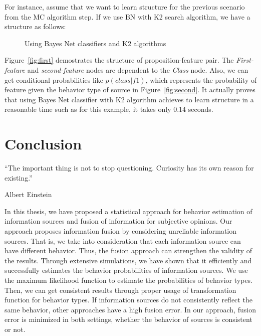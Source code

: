 \documentclass[a4,12pt]{ozu-thesis}
\begin{document}
For instance, assume that we want to learn structure for the previous scenario from the MC algorithm step. If we use BN with K2 search algorithm, we have a structure as follows:

\begin{figure}[ht!]
     \begin{center}
%
%
    \end{center}
    \caption{Using Bayes Net classifiers and K2 algorithms}
\end{figure}


Figure~\ref{fig:first} demostrates the structure of proposition-feature pair. The \textit{First-feature} and \textit{second-feature} nodes are dependent to the \textit{Class} node. Also, we can get conditional probabilities like $p\left ( class|f1 \right )$, which represents the probability of feature given the behavior type of source in Figure~\ref{fig:second}. It actually proves that using Bayes Net classifier with K2 algorithm achieves to learn structure in a reasonable time such as for this example, it takes only 0.14 seconds.

\chapter{Conclusion}
\epigraph{``The important thing is not to stop questioning. Curiosity has its own reason for existing.''}{Albert Einstein}
In this thesis, we have proposed a statistical approach for behavior estimation of information sources and fusion of information for subjective opinions. Our approach proposes information fusion by considering unreliable information sources. That is, we take into consideration that each information source can have different behavior. Thus, the fusion approach can strengthen the validity of the results. Through extensive simulations, we have shown that it efficiently and successfully estimates the behavior probabilities of information sources. We use the maximum likelihood function to estimate the probabilities of behavior types. Then, we can get consistent results through proper usage of transformation function for behavior types. If information sources do not consistently reflect the same behavior, other approaches have a high fusion error. In our approach, fusion error is minimized in both settings, whether the behavior of sources is consistent or not. 
\end{document}
